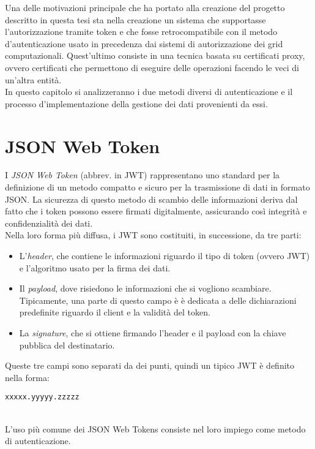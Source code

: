Una delle motivazioni principale che ha portato alla creazione del progetto descritto in questa tesi 
sta nella creazione un sistema che supportasse 
l'autorizzazione tramite token e che fosse retrocompatibile con il metodo d'autenticazione usato in precedenza dai sistemi di autorizzazione dei grid computazionali.  
Quest'ultimo consiste in una tecnica basata su certificati proxy, ovvero certificati che permettono di eseguire delle operazioni facendo le veci di un'altra entità. 
\\ In questo capitolo si analizzeranno i due metodi diversi di autenticazione e il processo d'implementazione della gestione 
dei dati provenienti da essi.

\section{JSON Web Token}
I \textit{JSON Web Token} (abbrev. in JWT) rappresentano uno standard per la definizione di un metodo 
compatto e sicuro per la trasmissione di dati in formato JSON. La sicurezza di questo metodo di scambio delle 
informazioni deriva dal fatto che i token possono essere firmati digitalmente, assicurando così integrità e confidenzialità dei dati.  
\\ Nella loro forma più diffusa, i JWT sono costituiti, in successione, da tre parti:
\begin{itemize}
    \item L'\textit{header}, che contiene le informazioni riguardo il tipo di token (ovvero JWT) e 
    l'algoritmo usato per la firma dei dati. 
    \item Il \textit{payload}, dove risiedono le informazioni che si vogliono scambiare. Tipicamente, una parte di questo campo è 
    è dedicata a delle dichiarazioni predefinite riguardo il client e la validità del token. 
    \item La \textit{signature}, che si ottiene firmando l'header e il payload con la chiave pubblica del destinatario.
\end{itemize}
Queste tre campi sono separati da dei punti, quindi un tipico JWT è definito nella forma:
\\ \centerline{\texttt{xxxxx.yyyyy.zzzzz}}
\\ L'uso più comune dei JSON Web Tokens consiste nel loro impiego come metodo di autenticazione.


